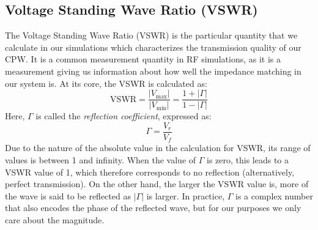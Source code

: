 \subsection{Voltage Standing Wave Ratio (VSWR)}
\label{swr}
The Voltage Standing Wave Ratio (VSWR) is the particular quantity that we calculate in our simulations which characterizes
the transmission quality of our CPW. It is a common measurement quantity in RF simulations, as it is a
measurement giving us information about how well the impedance matching in our system is. At its core, the
VSWR is calculated as:
\[
	\text{VSWR} = \frac{|V_\text{max}|}{|V_\text{min}|} = \frac{1 + |\Gamma|}{1 - |\Gamma|}
\]
Here, \( \Gamma \) is called the \textit{reflection coefficient}, expressed as:
\[
	\Gamma = \frac{V_r}{V_f}
\]
Due to the nature of the absolute value in the calculation for VSWR, its range of values is between 1 and
infinity. When the value of \( \Gamma \) is zero, this leads to a VSWR value of 1, which therefore
corresponds to no reflection (alternatively, perfect transmission). On the other hand, the larger the VSWR
value is, more of the wave is said to be reflected as \( |\Gamma| \) is larger. In practice, \( \Gamma \) is
a complex number that also encodes the phase of the reflected wave, but for our purposes we only care about
the magnitude.   


 
 
 
